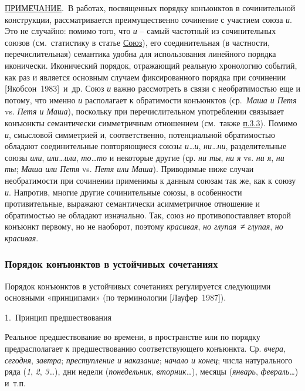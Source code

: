 \underline{ПРИМЕЧАНИЕ}.~В работах, посвященных порядку конъюнктов в
сочинительной конструкции, рассматривается преимущественно сочинение с
участием союза \textit{и}. Это не случайно: помимо того, что \textit{и} --
самый частотный из сочинительных союзов (см.~статистику в статье
\underline{Союз}), его соединительная (в частности, перечислительная)
семантика удобна для использования линейного порядка иконически.
Иконический порядок, отражающий реальную хронологию событий, как раз и
является основным случаем фиксированного порядка при сочинении
{[}Якобсон~1983{]}~и~др. Союз \textit{и} важно рассмотреть в связи с
необратимостью еще и потому, что именно \textit{и} располагает к
обратимости конъюнктов (ср.~\textit{Маша и Петя} vs. \textit{Петя и Маша}),
поскольку при перечислительном употреблении связывает конъюнкты
семантически симметричным отношением (см.~также \underline{п.3.3}).
Помимо \textit{и}, смысловой симметрией и, соответственно, потенциальной
обратимостью обладают соединительные повторяющиеся союзы
\textit{и\ldots и}, \textit{ни\ldots ни}, разделительные союзы \textit{или},
\textit{или\ldots или}, \textit{то\ldots то} и некоторые другие (ср.
\textit{ни ты}, \textit{ни я} vs. \textit{ни я}, \textit{ни ты}; \textit{Маша или
  Петя} vs. \textit{Петя или Маша}). Приводимые ниже случаи необратимости
при сочинении применимы к данным союзам так же, как к союзу \textit{и}.
Напротив, многие другие сочинительные союзы, в особенности
противительные, выражают семантически асимметричное отношение и
обратимостью не обладают изначально. Так, союз \textit{но}
противопоставляет второй конъюнкт первому, но не наоборот, поэтому
\textit{красивая}, \textit{но глупая}~≠ \textit{глупая}, \textit{но красивая}.

\subsubsection{Порядок конъюнктов в устойчивых
  сочетаниях}\label{ux43fux43eux440ux44fux434ux43eux43a-ux43aux43eux43dux44aux44eux43dux43aux442ux43eux432-ux432-ux443ux441ux442ux43eux439ux447ux438ux432ux44bux445-ux441ux43eux447ux435ux442ux430ux43dux438ux44fux445}

Порядок конъюнктов в устойчивых сочетаниях регулируется следующими
основными «принципами» (по терминологии {[}Лауфер~1987{]}).

1.~Принцип предшествования

Реальное предшествование во времени, в пространстве или по порядку
предрасполагает к предшествованию соответствующего конъюнкта. Ср.
\textit{вчера}, \textit{сегодня}, \textit{завтра}; \textit{преступление и
  наказание}; \textit{начало и конец}; числа натурального ряда (\textit{1},
\textit{2}, \textit{3\ldots{}}), дни недели (\textit{понедельник},
\textit{вторник\ldots{}}), месяцы (\textit{январь}, \textit{февраль\ldots{}})
и~т.п.

